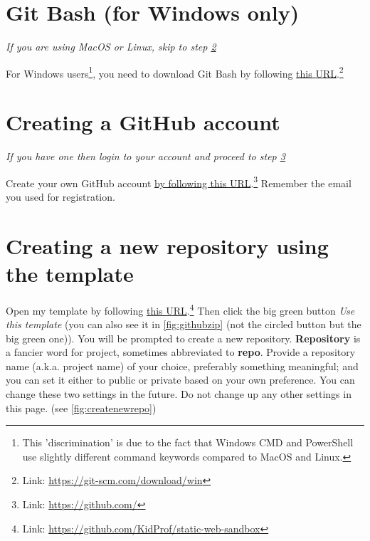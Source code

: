 \section{Git Bash (for Windows only)}
\label{sec:install1}

\textit{If you are using MacOS or Linux, skip to step \cref{sec:install2}}
\vspace{6mm}

For Windows users\footnote{This 'discrimination' is due to the fact that Windows CMD and PowerShell use slightly different command keywords compared to MacOS and Linux.}, you need to download Git Bash by following \href{https://git-scm.com/download/win}{this URL}.\footnote{Link: \url{https://git-scm.com/download/win}} 

\section{Creating a GitHub account}
\label{sec:install2}

\textit{If you have one then login to your account and proceed to step \cref{sec:install3}}
\vspace{6mm}

Create your own GitHub account \href{https://github.com/}{by following this URL}.\footnote{Link: \url{https://github.com/}} Remember the email you used for registration.

\section{Creating a new repository using the template}
\label{sec:install3}

Open my template by following \href{https://github.com/KidProf/static-web-sandbox}{this URL}.\footnote{Link: \url{https://github.com/KidProf/static-web-sandbox}} Then click the big green button \textit{Use this template} (you can also see it in \cref{fig:githubzip} (not the circled button but the big green one)). You will be prompted to create a new repository. \textbf{Repository} is a fancier word for project, sometimes abbreviated to \textbf{repo}. Provide a repository name (a.k.a. project name) of your choice, preferably something meaningful; and you can set it either to public or private based on your own preference. You can change these two settings in the future. Do not change up any other settings in this page. (see \cref{fig:createnewrepo})

